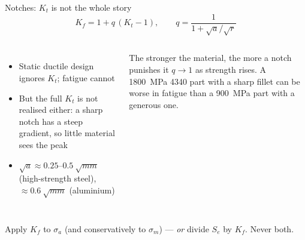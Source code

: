 \documentclass[aspectratio=169,10pt]{beamer}
\begin{document}
\begin{frame}{Notches: $K_t$ is not the whole story}
\[
K_f = 1+q\,(K_t-1),\qquad q=\frac{1}{1+\sqrt{a}/\sqrt{r}}
\]
\begin{columns}[T]
\begin{itemize}
  \item Static ductile design ignores $K_t$; \alert{fatigue cannot}
  \item But the full $K_t$ is not realised either: a sharp notch has a steep gradient, so little material sees the peak
  \item $\sqrt{a}\approx0.25$--$\SI{0.5}{\sqrt{mm}}$ (high-strength steel), $\approx\SI{0.6}{\sqrt{mm}}$ (aluminium)
\end{itemize}
\begin{alertblock}{The stronger the material, the more a notch punishes it}
$q\to1$ as strength rises. A \SI{1800}{MPa} 4340 part with a sharp fillet can be worse in fatigue than a \SI{900}{MPa} part with a generous one.
\end{alertblock}
\end{columns}
\vspace{2pt}
\footnotesize Apply $K_f$ to $\sigma_a$ (and conservatively to $\sigma_m$) --- \emph{or} divide $S_e$ by $K_f$. Never both.
\end{frame}
\end{document}

